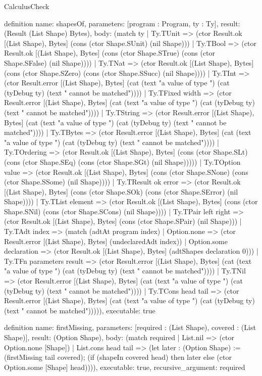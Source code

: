 \begin{lexlean}{CalculusCheck}
\begin{semanticmodule}
definition{
  name: shapesOf,
  parameters: [program : Program, ty : Ty],
  result: (Result (List Shape) Bytes),
  body: (match ty
    | Ty.TUnit => (ctor Result.ok [(List Shape), Bytes] (cons (ctor Shape.SUnit) (nil Shape)))
    | Ty.TBool => (ctor Result.ok [(List Shape), Bytes] (cons (ctor Shape.STrue) (cons (ctor Shape.SFalse) (nil Shape))))
    | Ty.TNat => (ctor Result.ok [(List Shape), Bytes] (cons (ctor Shape.SZero) (cons (ctor Shape.SSucc) (nil Shape))))
    | Ty.TInt => (ctor Result.error [(List Shape), Bytes] (cat (text "a value of type ") (cat (tyDebug ty) (text " cannot be matched"))))
    | Ty.TFixed width => (ctor Result.error [(List Shape), Bytes] (cat (text "a value of type ") (cat (tyDebug ty) (text " cannot be matched"))))
    | Ty.TString => (ctor Result.error [(List Shape), Bytes] (cat (text "a value of type ") (cat (tyDebug ty) (text " cannot be matched"))))
    | Ty.TBytes => (ctor Result.error [(List Shape), Bytes] (cat (text "a value of type ") (cat (tyDebug ty) (text " cannot be matched"))))
    | Ty.TOrdering => (ctor Result.ok [(List Shape), Bytes] (cons (ctor Shape.SLt) (cons (ctor Shape.SEq) (cons (ctor Shape.SGt) (nil Shape)))))
    | Ty.TOption value => (ctor Result.ok [(List Shape), Bytes] (cons (ctor Shape.SNone) (cons (ctor Shape.SSome) (nil Shape))))
    | Ty.TResult ok error => (ctor Result.ok [(List Shape), Bytes] (cons (ctor Shape.SOk) (cons (ctor Shape.SError) (nil Shape))))
    | Ty.TList element => (ctor Result.ok [(List Shape), Bytes] (cons (ctor Shape.SNil) (cons (ctor Shape.SCons) (nil Shape))))
    | Ty.TPair left right => (ctor Result.ok [(List Shape), Bytes] (cons (ctor Shape.SPair) (nil Shape)))
    | Ty.TAdt index => (match (adtAt program index)
      | Option.none => (ctor Result.error [(List Shape), Bytes] (undeclaredAdt index))
      | Option.some declaration => (ctor Result.ok [(List Shape), Bytes] (adtShapes declaration 0)))
    | Ty.TFn parameters result => (ctor Result.error [(List Shape), Bytes] (cat (text "a value of type ") (cat (tyDebug ty) (text " cannot be matched"))))
    | Ty.TNil => (ctor Result.error [(List Shape), Bytes] (cat (text "a value of type ") (cat (tyDebug ty) (text " cannot be matched"))))
    | Ty.TCons head tail => (ctor Result.error [(List Shape), Bytes] (cat (text "a value of type ") (cat (tyDebug ty) (text " cannot be matched"))))),
  executable: true
}

definition{
  name: firstMissing,
  parameters: [required : (List Shape), covered : (List Shape)],
  result: (Option Shape),
  body: (match required
    | List.nil => (ctor Option.none [Shape])
    | List.cons head tail => (let later : (Option Shape) := (firstMissing tail covered); (if (shapeIn covered head) then later else (ctor Option.some [Shape] head)))),
  executable: true,
  recursive_argument: required
}


\end{semanticmodule}
\end{lexlean}

